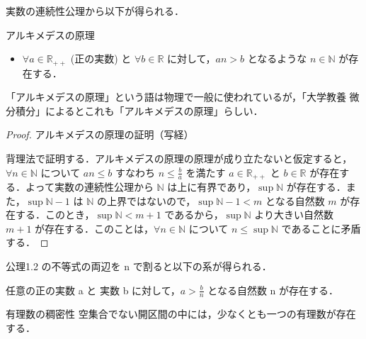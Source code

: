 \documentclass[xelatex,ja=standard,jafont=noto]{bxjsarticle}
\begin{document}
実数の連続性公理から以下が得られる．
  \begin{corollary}{アルキメデスの原理}{}
   \begin{itemize}
   \item $ \forall a \in \mathbb{R} _ {++}$ (正の実数) と $\forall b \in \mathbb{R}$ に対して，$an > b$ となるような $n \in \mathbb{N}$ が存在する．

   \end{itemize}
  \end{corollary}
「アルキメデスの原理」という語は物理で一般に使われているが，「大学教養 微分積分」によるとこれも「アルキメデスの原理」らしい．

  \begin{proof}{アルキメデスの原理の証明（写経）}{}

   背理法で証明する．アルキメデスの原理の原理が成り立たないと仮定すると，$\forall n \in \mathbb{N}$ について $an \leq b$ すなわち $n \leq \frac{b}{a}$ を満たす $a \in \mathbb{R}_{++}$ と $b \in \mathbb{R}$ が存在する．よって実数の連続性公理から $\mathbb{N}$ は上に有界であり，$\sup \mathbb{N}$ が存在する．また，$\sup \mathbb{N} - 1$ は $\mathbb{N}$ の上界ではないので，$\sup \mathbb{N} - 1 < m$ となる自然数 $m$ が存在する．このとき，$\sup \mathbb{N} < m + 1$ であるから，$\sup \mathbb{N}$ より大きい自然数 $m + 1$ が存在する．このことは，$\forall n \in \mathbb{N}$ について $n \leq \sup \mathbb{N}$ であることに矛盾する．

  \end{proof}


 公理1.2 の不等式の両辺を n で割ると以下の系が得られる．

  \begin{corollary}{}{}
   任意の正の実数 a と 実数 b に対して，$a > \frac{b}{n}$ となる自然数 n が存在する．
  \end{corollary}

  \begin{theorem}{有理数の稠密性}{}
   空集合でない開区間の中には，少なくとも一つの有理数が存在する．
  \end{theorem}
\end{document}
